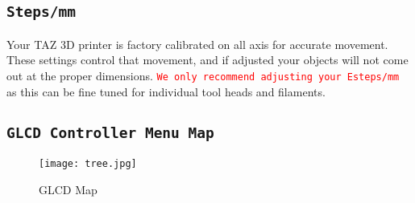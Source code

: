 \subsection{\texttt{Steps/mm}}
Your TAZ 3D printer is factory calibrated on all axis for accurate movement. These settings control that movement, and if adjusted your objects will not come out at the proper dimensions. \textcolor{red}{\texttt{We only recommend adjusting your Esteps/mm}} as this can be fine tuned for individual tool heads and filaments. 

\subsection{\texttt{GLCD Controller Menu Map}}
\begin{figure}[H]
\centering
\texttt{[image: tree.jpg]}
\caption{GLCD Map}
\label{fig:GLCD_Map}
\end{figure}




